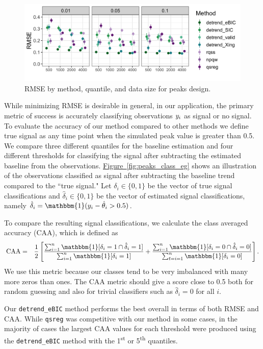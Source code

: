 \documentclass[aoas]{imsart}
\newcommand{\Fig}[1]{\hyperref[fig:#1]{Figure~\ref*{fig:#1}}} %
\newcommand{\Fig}[1]{{Figure~\ref{fig:#1}}} %
\newcommand{\One}{\mathbbm{1}}
\newcommand{\VE}[2]{\MakeLowercase{#1}_{#2}} %
\begin{document}
\begin{figure}
	\includegraphics[width = \linewidth]{Figures/peaks_mse.png}
	\caption{RMSE by method, quantile, and data size for peaks design.}
	\label{fig:peaks_rmse}
\end{figure}

While minimizing RMSE is desirable in general, in our application, the primary metric of success is accurately classifying observations $\VE{y}{i}$ as signal or no signal. To evaluate the accuracy of our method compared to other methods we define true signal as any time point when the simulated peak value is greater than 0.5. We compare three different quantiles for the baseline estimation and four different thresholds for classifying the signal after subtracting the estimated baseline from the observations.  \Fig{peaks_class_eg} shows an illustration of the observations classified as signal after subtracting the baseline trend compared to the ``true signal." Let $\delta_i \in \{0,1\}$ be the vector of true signal classifications and $\hat{\delta}_i \in \{0,1\}$ be the vector of estimated signal classifications, namely $\hat{\delta}_i = \One(\VE{y}{i} - \hat{\theta}_{i} > 0.5)$.


To compare the resulting signal classifications, we calculate the class averaged accuracy (CAA), which is defined as
\begin{eqnarray*}
	\mbox{CAA} & = & \frac{1}{2}\left[\frac{\sum_{i=1}^n \One[\delta_i = 1 \cap \hat{\delta}_i = 1]}{\sum_{i=1}^n \One[\delta_i = 1]} + \frac{\sum_{i=1}^n \One[\delta_i = 0 \cap \hat{\delta}_i=0]}{\sum_{t=i=1}^n \One[\delta_i = 0]}\right].
\end{eqnarray*}
We use this metric because our classes tend to be very imbalanced with many more zeros than ones. The CAA metric should give a score close to 0.5 both for random guessing and also for trivial classifiers such as $\hat{\delta}_i = 0$ for all $i$.

Our \texttt{detrend\_eBIC} method performs the best overall in terms of both RMSE and CAA. While \texttt{qsreg} was competitive with our method in some cases, in the majority of cases the largest CAA values for each threshold were produced using the \texttt{detrend\_eBIC} method with the 1\textsuperscript{st} or 5\textsuperscript{th} quantiles.
\end{document}
